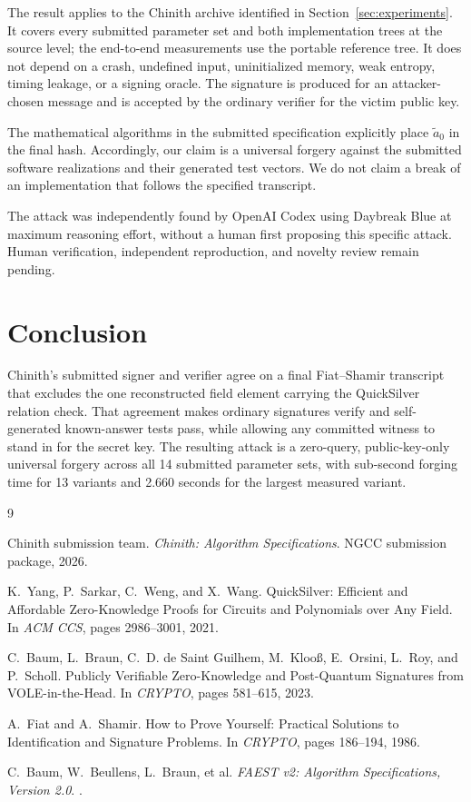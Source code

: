 \documentclass[11pt,a4paper]{article}
\begin{document}
The result applies to the Chinith archive identified in
Section~\ref{sec:experiments}.  It covers every submitted parameter set and
both implementation trees at the source level; the end-to-end measurements
use the portable reference tree.  It does not depend on a crash, undefined
input, uninitialized memory, weak entropy, timing leakage, or a signing
oracle.  The signature is produced for an attacker-chosen message and is
accepted by the ordinary verifier for the victim public key.

The mathematical algorithms in the submitted specification explicitly place
$\widetilde a_0$ in the final hash.  Accordingly, our claim is a universal
forgery against the submitted software realizations and their generated test
vectors.  We do not claim a break of an implementation that follows the
specified transcript.

The attack was independently found by OpenAI Codex using Daybreak Blue at
maximum reasoning effort, without a human first proposing this specific
attack.  Human verification, independent reproduction, and novelty review
remain pending.

\section{Conclusion}

Chinith's submitted signer and verifier agree on a final Fiat--Shamir
transcript that excludes the one reconstructed field element carrying the
QuickSilver relation check.  That agreement makes ordinary signatures verify
and self-generated known-answer tests pass, while allowing any committed
witness to stand in for the secret key.  The resulting attack is a
zero-query, public-key-only universal forgery across all 14 submitted
parameter sets, with sub-second forging time for 13 variants and 2.660 seconds
for the largest measured variant.

\begin{thebibliography}{9}

Chinith submission team.
\newblock \emph{Chinith: Algorithm Specifications}.
\newblock NGCC submission package, 2026.

K.~Yang, P.~Sarkar, C.~Weng, and X.~Wang.
\newblock QuickSilver: Efficient and Affordable Zero-Knowledge Proofs for
  Circuits and Polynomials over Any Field.
\newblock In \emph{ACM CCS}, pages 2986--3001, 2021.

C.~Baum, L.~Braun, C.~D. de Saint Guilhem, M.~Kloo\ss, E.~Orsini,
  L.~Roy, and P.~Scholl.
\newblock Publicly Verifiable Zero-Knowledge and Post-Quantum Signatures from
  VOLE-in-the-Head.
\newblock In \emph{CRYPTO}, pages 581--615, 2023.

A.~Fiat and A.~Shamir.
\newblock How to Prove Yourself: Practical Solutions to Identification and
  Signature Problems.
\newblock In \emph{CRYPTO}, pages 186--194, 1986.

C.~Baum, W.~Beullens, L.~Braun, et al.
\newblock \emph{FAEST v2: Algorithm Specifications, Version 2.0}.
.

\end{thebibliography}
\end{document}
